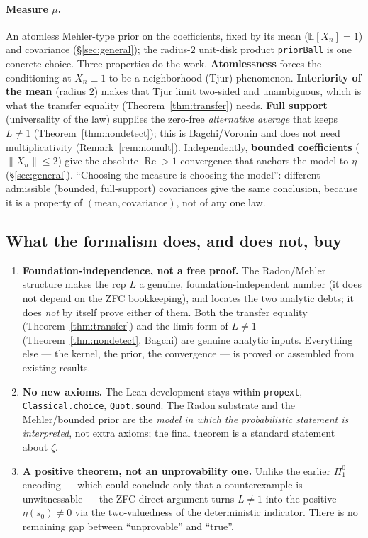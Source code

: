 \documentclass[11pt,a4paper]{article}
\theoremstyle{definition}
\newcommand{\Rea}{\operatorname{Re}}
\begin{document}
\paragraph{Measure \(\mu\).} An atomless Mehler-type prior on the coefficients, fixed by its
mean (\(\mathbb{E}[X_n]=1\)) and covariance (\S\ref{sec:general}); the radius-\(2\)
unit-disk product \texttt{priorBall} is one concrete choice. Three properties do the work.
\textbf{Atomlessness} forces the conditioning at \(X_n\equiv1\) to be a neighborhood (Tjur)
phenomenon. \textbf{Interiority of the mean} (radius \(2\)) makes that Tjur limit two-sided
and unambiguous, which is what the transfer equality (Theorem~\ref{thm:transfer}) needs.
\textbf{Full support} (universality of the law) supplies the zero-free \emph{alternative
average} that keeps \(L\neq1\) (Theorem~\ref{thm:nondetect}); this is Bagchi/Voronin and does
not need multiplicativity (Remark~\ref{rem:nomult}). Independently, \textbf{bounded
coefficients} (\(\|X_n\|\le2\)) give the absolute \(\Rea>1\) convergence that anchors the
model to \(\eta\) (\S\ref{sec:general}). ``Choosing the measure is choosing the model'':
different admissible (bounded, full-support) covariances give the same conclusion, because it
is a property of \((\text{mean},\text{covariance})\), not of any one law.

\subsection{What the formalism does, and does not, buy}\label{sec:fences}

\begin{enumerate}
  \item \textbf{Foundation-independence, not a free proof.} The Radon/Mehler structure makes
        the rcp \(L\) a genuine, foundation-independent number (it does not depend on the
        ZFC bookkeeping), and locates the two analytic debts; it does \emph{not} by itself
        prove either of them. Both the transfer equality (Theorem~\ref{thm:transfer}) and the
        limit form of \(L\neq1\) (Theorem~\ref{thm:nondetect}, Bagchi) are genuine analytic
        inputs. Everything else --- the kernel, the prior, the convergence --- is proved or
        assembled from existing results.
  \item \textbf{No new axioms.} The Lean development stays within \texttt{propext},
        \texttt{Classical.choice}, \texttt{Quot.sound}. The Radon substrate and the
        Mehler/bounded prior are the \emph{model in which the probabilistic statement is
        interpreted}, not extra axioms; the final theorem is a standard statement about
        \(\zeta\).
  \item \textbf{A positive theorem, not an unprovability one.} Unlike the earlier
        \(\Pi^0_1\) encoding --- which could conclude only that a counterexample is
        unwitnessable --- the ZFC-direct argument turns \(L\neq1\) into the positive
        \(\eta(s_0)\neq0\) via the two-valuedness of the deterministic indicator. There is
        no remaining gap between ``unprovable'' and ``true''.
\end{enumerate}
\end{document}
